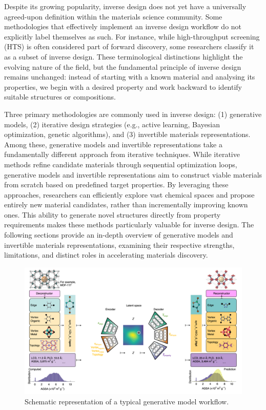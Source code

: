 Despite its growing popularity, inverse design does not yet have a universally agreed-upon definition within the materials science community. Some methodologies that effectively implement an inverse design workflow do not explicitly label themselves as such. For instance, while high-throughput screening (HTS) is often considered part of forward discovery, some researchers classify it as a subset of inverse design. These terminological distinctions highlight the evolving nature of the field, but the fundamental principle of inverse design remains unchanged: instead of starting with a known material and analysing its properties, we begin with a desired property and work backward to identify suitable structures or compositions. 

Three primary methodologies are commonly used in inverse design: (1) generative models, (2) iterative design strategies (e.g., active learning, Bayesian optimization, genetic algorithms), and (3) invertible materials representations. Among these, generative models and invertible representations take a fundamentally different approach from iterative techniques. While iterative methods refine candidate materials through sequential optimization loops, generative models and invertible representations aim to construct viable materials from scratch based on predefined target properties. By leveraging these approaches, researchers can efficiently explore vast chemical spaces and propose entirely new material candidates, rather than incrementally improving known ones. This ability to generate novel structures directly from property requirements makes these methods particularly valuable for inverse design. The following sections provide an in-depth overview of generative models and invertible materials representations, examining their respective strengths, limitations, and distinct roles in accelerating materials discovery.

\begin{figure}[ht]
    \centering
    \includegraphics[width=\textwidth]{figures/literature-review/figure2-7.png}
    \caption{Schematic representation of a typical generative model workflow\cite{RN412}.}
    \label{fig:figure2.7}
\end{figure}

